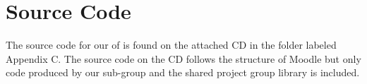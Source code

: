 
\chapter{Source Code}
The source code for our \subsystem{} of \system{} is found on the attached CD in the folder labeled Appendix C. 
The source code on the CD follows the structure of Moodle but only code produced by our sub-group and the shared project group library is included. 